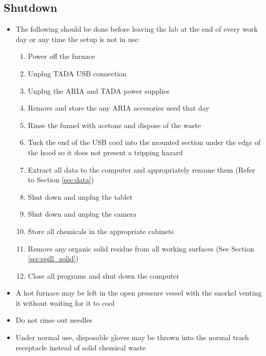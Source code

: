 \documentclass[letterpaper,11pt]{article}
\begin{document}
    
\subsection{Shutdown}
    \begin{itemize}
    \item The following should be done before leaving the lab at the end of 
        every work day or any time the setup is not in use:
        \begin{enumerate}
        \item Power off the furnace
        \item Unplug TADA USB connection
        \item Unplug the ARIA and TADA power supplies 
        \item Remove and store the any ARIA accesories used that day
        \item Rinse the funnel with acetone and dispose of the waste
        \item Tuck the end of the USB cord into the mounted section under the 
            edge of the hood so it does not present a tripping hazard
        \item Extract all data to the computer and appropriately rename them 
            (Refer to Section \ref{sec:data})
        \item Shut down and unplug the tablet 
        \item Shut down and unplug the camera
        \item Store all chemicals in the appropriate cabinets
        \item Remove any organic solid residue from all working surfaces 
            (See Section \ref{sec:spill_solid})
        \item Close all programs and shut down the computer
        \end{enumerate}
    
    \item A hot furnace may be left in the open pressure vessel with the snorkel 
        venting it without waiting for it to cool
    \item Do not rinse out needles %
    \item Under normal use, disposable gloves may be thrown into the normal 
        trash receptacle instead of solid chemical waste
    \end{itemize}

\newpage    
\end{document}
